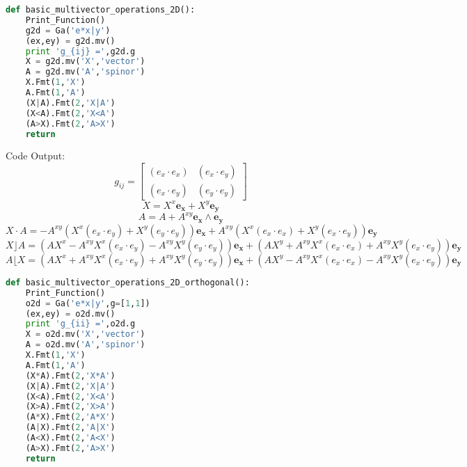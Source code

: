 \documentclass[10pt,fleqn]{report}
\begin{document}
\begin{lstlisting}[language=Python,showspaces=false,showstringspaces=false,backgroundcolor=\color{gray},frame=single]
def basic_multivector_operations_2D():
    Print_Function()
    g2d = Ga('e*x|y')
    (ex,ey) = g2d.mv()
    print 'g_{ij} =',g2d.g
    X = g2d.mv('X','vector')
    A = g2d.mv('A','spinor')
    X.Fmt(1,'X')
    A.Fmt(1,'A')
    (X|A).Fmt(2,'X|A')
    (X<A).Fmt(2,'X<A')
    (A>X).Fmt(2,'A>X')
    return
\end{lstlisting}
Code Output:
\begin{equation*} g_{ij} = \left[\begin{matrix}\left ( e_{x}\cdot e_{x}\right )  & \left ( e_{x}\cdot e_{y}\right ) \\\left ( e_{x}\cdot e_{y}\right )  & \left ( e_{y}\cdot e_{y}\right ) \end{matrix}\right] \end{equation*}
\begin{equation*} X = X^{x} \boldsymbol{e_{x}} + X^{y} \boldsymbol{e_{y}} \end{equation*}
\begin{equation*} A = A  + A^{xy} \boldsymbol{e_{x}\wedge e_{y}} \end{equation*}
\begin{equation*} X\cdot A = - A^{xy} \left(X^{x} \left ( e_{x}\cdot e_{y}\right )  + X^{y} \left ( e_{y}\cdot e_{y}\right ) \right) \boldsymbol{e_{x}} + A^{xy} \left(X^{x} \left ( e_{x}\cdot e_{x}\right )  + X^{y} \left ( e_{x}\cdot e_{y}\right ) \right) \boldsymbol{e_{y}} \end{equation*}
\begin{equation*} X\rfloor A = \left ( A X^{x} - A^{xy} X^{x} \left ( e_{x}\cdot e_{y}\right )  - A^{xy} X^{y} \left ( e_{y}\cdot e_{y}\right ) \right ) \boldsymbol{e_{x}} + \left ( A X^{y} + A^{xy} X^{x} \left ( e_{x}\cdot e_{x}\right )  + A^{xy} X^{y} \left ( e_{x}\cdot e_{y}\right ) \right ) \boldsymbol{e_{y}} \end{equation*}
\begin{equation*} A\lfloor X = \left ( A X^{x} + A^{xy} X^{x} \left ( e_{x}\cdot e_{y}\right )  + A^{xy} X^{y} \left ( e_{y}\cdot e_{y}\right ) \right ) \boldsymbol{e_{x}} + \left ( A X^{y} - A^{xy} X^{x} \left ( e_{x}\cdot e_{x}\right )  - A^{xy} X^{y} \left ( e_{x}\cdot e_{y}\right ) \right ) \boldsymbol{e_{y}} \end{equation*}
\begin{lstlisting}[language=Python,showspaces=false,showstringspaces=false,backgroundcolor=\color{gray},frame=single]
def basic_multivector_operations_2D_orthogonal():
    Print_Function()
    o2d = Ga('e*x|y',g=[1,1])
    (ex,ey) = o2d.mv()
    print 'g_{ii} =',o2d.g
    X = o2d.mv('X','vector')
    A = o2d.mv('A','spinor')
    X.Fmt(1,'X')
    A.Fmt(1,'A')
    (X*A).Fmt(2,'X*A')
    (X|A).Fmt(2,'X|A')
    (X<A).Fmt(2,'X<A')
    (X>A).Fmt(2,'X>A')
    (A*X).Fmt(2,'A*X')
    (A|X).Fmt(2,'A|X')
    (A<X).Fmt(2,'A<X')
    (A>X).Fmt(2,'A>X')
    return
\end{lstlisting}
\end{document}
